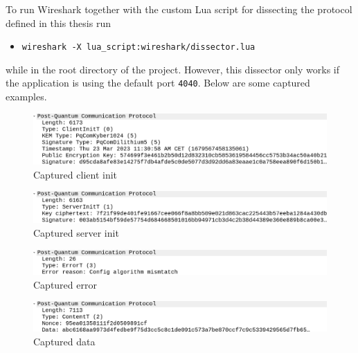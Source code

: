 To run Wireshark together with the custom Lua script for dissecting the protocol defined in this thesis run
\begin{itemize}
  \item \texttt{wireshark -X lua\_script:wireshark/dissector.lua}
\end{itemize}
while in the root directory of the project. However, this dissector only works if the application is using the default port \texttt{4040}. Below are some captured examples.
\begin{figure}[ht!]
  \centering
  \includegraphics[width=\textwidth]{pictures/clientinit.png}
  \caption{Captured client init}
  \label{img:cap_clientinit}
\end{figure}

\begin{figure}[ht!]
  \centering
  \includegraphics[width=\textwidth]{pictures/serverinit.png}
  \caption{Captured server init}
  \label{img:cap_serverinit}
\end{figure}

\begin{figure}[ht!]
  \centering
  \includegraphics[width=\textwidth]{pictures/error.png}
  \caption{Captured error}
  \label{img:cap_error}
\end{figure}

\begin{figure}[ht!]
  \centering
  \includegraphics[width=\textwidth]{pictures/data.png}
  \caption{Captured data}
  \label{img:cap_data}
\end{figure}
